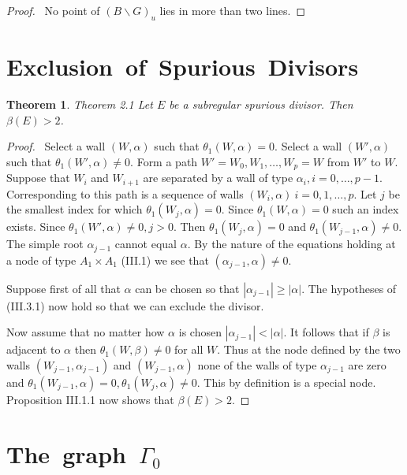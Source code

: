 \documentclass{memo-l}
\newtheorem{theorem}{Theorem}[section]
\theoremstyle{definition}
\theoremstyle{remark}
\numberwithin{section}{chapter}
\numberwithin{equation}{chapter}
\begin{document}
\medskip

\begin{proof} \  No point of $(B\backslash G)_{u}$ lies in more than
two lines.
\end{proof} 


\section{{Exclusion\ of\ Spurious\ Divisors}}

\begin{theorem}{Theorem 2.1}    Let $E$ be a subregular spurious divisor. 
 Then ${\beta}(E) > 2$.
\end{theorem}

\medpagebreak

\begin{proof} \ Select a wall $(W,{\alpha})$ such that
${\theta}_{1}(W,{\alpha}) = 0$.  Select a wall $(W',{\alpha})$ such that
${\theta}_{1}(W',{\alpha})\ne 0$.  Form a path $W' = W_{0},W_{1},\ldots ,
W_{p} = W$ from $W'$ to $W$.  Suppose that $W_{i}$ and $W_{i+1}$ are
separated by a wall of type ${\alpha}_{i}, i = 0,\ldots ,p-1$.  Corresponding
to this path is a sequence of walls $(W_{i},{\alpha})\  i = 0,1,\ldots ,p$.
Let $j$ be the smallest index for which ${\theta}_{1}(W_{j},{\alpha}) = 0$.
Since ${\theta}_{1}(W,{\alpha}) = 0$ such an index exists.  Since
${\theta}_{1}(W',{\alpha})\ne 0, j > 0$.  Then
${\theta}_{1}(W_{j},{\alpha}) = 0$ and ${\theta}_{1}(W_{j-1},{\alpha})\ne 0$.
The simple root ${\alpha}_{j-1}$ cannot equal ${\alpha}$.  By the nature of
the equations holding at a node of type $A_{1} \times A_{1}$ (III.1) we see
that $({\alpha}_{j-1},{\alpha})\ne 0$.

   Suppose first of all that ${\alpha}$ can be chosen so that 
   $|\alpha_{j-1}|\ge |\alpha|$.
  The hypotheses
of (III.3.1) now hold so that we can exclude the divisor.

   Now assume that no matter how ${\alpha}$ is chosen $|\alpha_{j-1}|< |\alpha|$.
  It follows that if ${\beta}$
is adjacent to ${\alpha}$ then ${\theta}_{1}(W,{\beta})\ne 0$ for all $W$.
Thus at the node defined by the two walls $(W_{j-1},{\alpha}_{j-1})$ and
$(W_{j-1},{\alpha})$ none of the walls of type ${\alpha}_{j-1}$ are zero
and ${\theta}_{1}(W_{j-1},{\alpha}) = 0, {\theta}_{1}(W_{j},{\alpha})\ne 0$.
This by definition is a special node.  Proposition III.1.1 now shows that
${\beta}(E) > 2$.
\end{proof} 

\section{The\ graph\ $\Gamma_0$}
\end{document}
